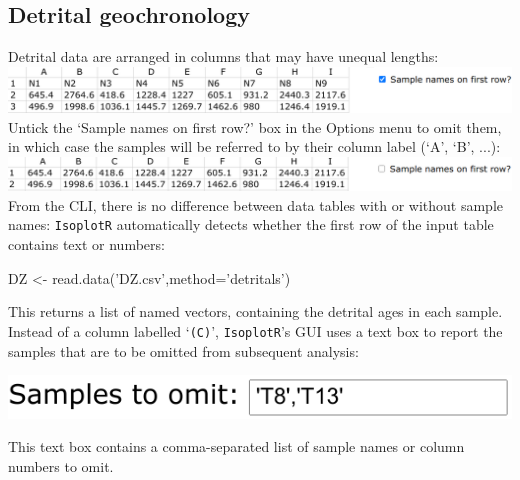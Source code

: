 \begin{refsection}

\chapter{Detrital geochronology}\label{ch:detrital-R}

Detrital data are arranged in columns that may have unequal lengths:\\

\noindent\includegraphics[width=\linewidth]{../figures/detritalInputTable.png}\\

Untick the `Sample names on first row?' box in the Options menu to
omit them, in which case the samples will be referred to by their
column label (`A', `B', ...):\\

\noindent\includegraphics[width=\linewidth]{../figures/detritalInputTableWithoutNames.png}\\

From the CLI, there is no difference between data tables with or
without sample names: \texttt{IsoplotR} automatically detects whether
the first row of the input table contains text or numbers:

\begin{console}
DZ <- read.data('DZ.csv',method='detritals')
\end{console}

This returns a list of named vectors, containing the detrital ages in
each sample. Instead of a column labelled `\texttt{(C)}',
\texttt{IsoplotR}'s GUI uses a text box to report the samples that are
to be omitted from subsequent analysis:

\noindent\begin{minipage}[t]{.4\linewidth}
\strut\vspace*{-\baselineskip}\newline
\includegraphics[width=\linewidth]{../figures/detritalOmit.png}
\end{minipage}
\begin{minipage}[t]{.6\linewidth}
This text box contains a comma-separated list of sample names or
column numbers to omit.
\end{minipage}


\end{refsection}
